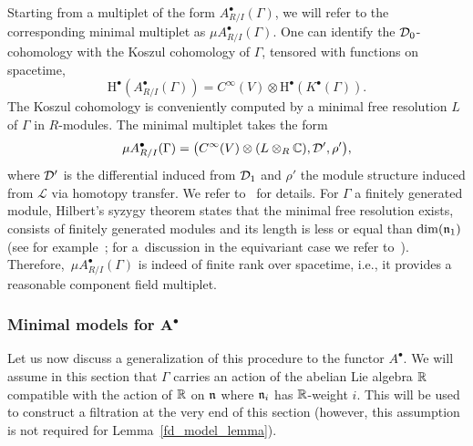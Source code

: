 \documentclass[11pt]{article}
\numberwithin{equation}{section}
\numberwithin{equation}{section}
\def\sL{\mathscr L}
\begin{document}
Starting from a multiplet of the form $A^\bullet_{R/I}(\Gamma)$, we will refer to the corresponding minimal multiplet as $\mu A^\bullet_{R/I}(\Gamma)$.
One can identify the $\mathcal D_0$-cohomology with the Koszul cohomology of $\Gamma$, tensored with functions on spacetime,
\begin{equation*}
\mathrm H^\bullet(A_{R/I}^\bullet(\Gamma)) = C^\infty(V) \otimes \mathrm H^\bullet(K^\bullet(\Gamma)) .
\end{equation*}
The Koszul cohomology is conveniently computed by a minimal free resolution $L$ of $\Gamma$ in $R$-modules. The minimal multiplet takes the form
\begin{equation*}
\mu A^\bullet_{R/I}(\Gamma) = \big( C^\infty(V) \otimes (L \otimes_R \mathbb C) , \mathcal D' ,\rho' \big) ,
\end{equation*}
where $\mathcal D'$ is the differential induced from $\mathcal D_1$ and $\rho'$ the module structure induced from $\sL$ via homotopy transfer. We refer to~\cite{perspectives} for details. For $\Gamma$ a finitely generated module, Hilbert's syzygy theorem states that the minimal free resolution exists, consists of finitely generated modules and its length is less or equal than $\dim(\mathfrak n_1)$ (see for example~\cite[Theorem 1.13]{MR1322960}; for a~discussion in the equivariant case we refer to~\cite[Proposition 2.4.9, Remark 2.4.10]{Galetto}). Therefore,~$\mu A_{R/I}^\bullet(\Gamma)$ is indeed of finite rank over spacetime, i.e., it provides a reasonable component field multiplet.

\subsubsection[Minimal models for A\^{}bullet]{Minimal models for $\boldsymbol{A^\bullet}$}

Let us now discuss a generalization of this procedure to the functor $A^\bullet$. We will assume in this section that $\Gamma$ carries an action of the abelian Lie algebra $\mathbb R$ compatible with the action of $\mathbb R$ on $\mathfrak n$ where $\mathfrak n_i$ has $\mathbb R$-weight $i$. This will be used to construct a filtration at the very end of this section (however, this assumption is not required for Lemma~\ref{fd_model_lemma}).
\end{document}
